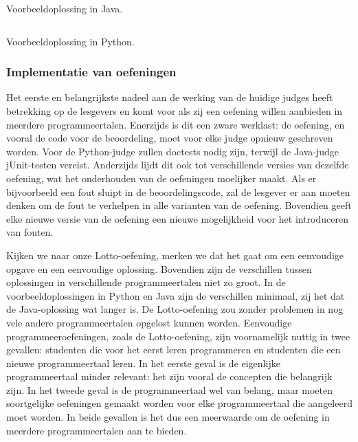 \begin{listing}
    \inputminted{java}{../../exercise/lotto/solution/correct.java}
    \caption{Voorbeeldoplossing in Java.}
    \label{lst:java-solution}
\end{listing}

\begin{listing}
    \inputminted{python3}{../../exercise/lotto/solution/correct.py}
    \caption{Voorbeeldoplossing in Python.}
    \label{lst:python-solution}
\end{listing}

\subsubsection{Implementatie van oefeningen}

Het eerste en belangrijkste nadeel aan de werking van de huidige judges heeft betrekking op de lesgevers en komt voor als zij een oefening willen aanbieden in meerdere programmeertalen.
Enerzijds is dit een zware werklast: de oefening, en vooral de code voor de beoordeling, moet voor elke judge opnieuw geschreven worden.
Voor de Python-judge zullen doctests nodig zijn, terwijl de Java-judge jUnit-testen vereist.
Anderzijds lijdt dit ook tot verschillende versies van dezelfde oefening, wat het onderhouden van de oefeningen moelijker maakt.
Als er bijvoorbeeld een fout sluipt in de beoordelingscode, zal de lesgever er aan moeten denken om de fout te verhelpen in alle varianten van de oefening.
Bovendien geeft elke nieuwe versie van de oefening een nieuwe mogelijkheid voor het introduceren van fouten.

Kijken we naar onze Lotto-oefening, merken we dat het gaat om een eenvoudige opgave en een eenvoudige oplossing.
Bovendien zijn de verschillen tussen oplossingen in verschillende programmeertalen niet zo groot.
In de voorbeeldoplossingen in Python en Java zijn de verschillen minimaal, zij het dat de Java-oplossing wat langer is.
De Lotto-oefening zou zonder problemen in nog vele andere programmeertalen opgelost kunnen worden.
Eenvoudige programmeeroefeningen, zoals de Lotto-oefening, zijn voornamelijk nuttig in twee gevallen: studenten die voor het eerst leren programmeren en studenten die een nieuwe programmeertaal leren.
In het eerste geval is de eigenlijke programmeertaal minder relevant: het zijn vooral de concepten die belangrijk zijn.
In het tweede geval is de programmeertaal wel van belang, maar moeten soortgelijke oefeningen gemaakt worden voor elke programmeertaal die aangeleerd moet worden.
In beide gevallen is het dus een meerwaarde om de oefening in meerdere programmeertalen aan te bieden.

